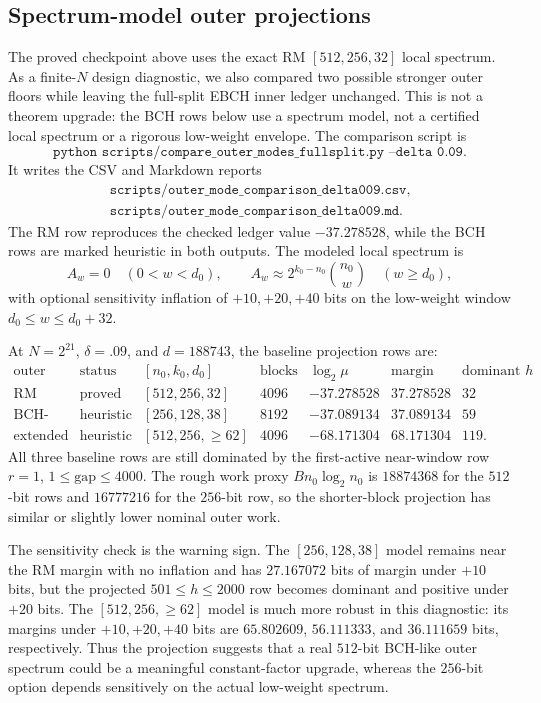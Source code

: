 \subsection{Spectrum-model outer projections}
\label{subsec:fullsplit-outer-spectrum-projections}

The proved checkpoint above uses the exact RM \([512,256,32]\) local spectrum.  As a finite-\(N\) design diagnostic, we
also compared two possible stronger outer floors while leaving the full-split EBCH inner ledger unchanged.  This is not
a theorem upgrade: the BCH rows below use a spectrum model, not a certified local spectrum or a rigorous low-weight
envelope.  The comparison script is
\[
\texttt{python scripts/compare\_outer\_modes\_fullsplit.py --delta 0.09}.
\]
It writes the CSV and Markdown reports
\[
\begin{gathered}
\texttt{scripts/outer\_mode\_comparison\_delta009.csv},\\
\texttt{scripts/outer\_mode\_comparison\_delta009.md}.
\end{gathered}
\]
The RM row reproduces the checked ledger value
\(-37.278528\), while the BCH rows are marked heuristic in both outputs.  The modeled local spectrum is
\[
A_w=0\quad(0<w<d_0),\qquad
A_w\approx 2^{k_0-n_0}\binom{n_0}{w}\quad(w\ge d_0),
\]
with optional sensitivity inflation of \(+10,+20,+40\) bits on the low-weight window
\(d_0\le w\le d_0+32\).

At \(N=2^{21}\), \(\delta=.09\), and \(d=188743\), the baseline projection rows are:
\[
\begin{array}{c|c|c|c|c|c|c}
\text{outer mode} & \text{status} & [n_0,k_0,d_0] & \text{blocks} &
\log_2\mu & \text{margin bits} & \text{dominant }h\\
\hline
\text{RM exact} & \text{proved} & [512,256,32] & 4096 & -37.278528 & 37.278528 & 32\\
\text{BCH-like} & \text{heuristic} & [256,128,38] & 8192 & -37.089134 & 37.089134 & 59\\
\text{extended BCH-like} & \text{heuristic} & [512,256,\ge62] & 4096 & -68.171304 & 68.171304 & 119 .
\end{array}
\]
All three baseline rows are still dominated by the first-active near-window row \(r=1\), \(1\le\mathrm{gap}\le4000\).
The rough work proxy \(B n_0\log_2 n_0\) is \(18874368\) for the \(512\)-bit rows and \(16777216\) for the \(256\)-bit
row, so the shorter-block projection has similar or slightly lower nominal outer work.

The sensitivity check is the warning sign.  The \([256,128,38]\) model remains near the RM margin with no inflation and
has \(27.167072\) bits of margin under \(+10\) bits, but the projected \(501\le h\le2000\) row becomes dominant and
positive under \(+20\) bits.  The \([512,256,\ge62]\) model is much more robust in this diagnostic: its margins under
\(+10,+20,+40\) bits are \(65.802609\), \(56.111333\), and \(36.111659\) bits, respectively.  Thus the projection
suggests that a real \(512\)-bit BCH-like outer spectrum could be a meaningful constant-factor upgrade, whereas the
\(256\)-bit option depends sensitively on the actual low-weight spectrum.

